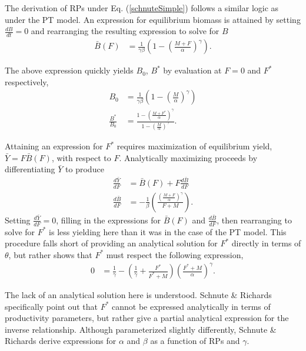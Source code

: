 %
The derivation of RPs under Eq. (\ref{schnuteSimple}) follows a similar logic
as under the PT model. An expression for equilibrium biomass is attained by
setting $\frac{dB}{dt}=0$ and rearranging the resulting expression to solve
for $B$
%
\begin{align}
\bar{B}(F) &= \frac{1}{\gamma \beta}\left(1-\left(\frac{M+F}{\alpha}\right)^\gamma\right).
\label{BsEq}
\end{align}

%
The above expression quickly yields $B_0$, $B^*$ by evaluation at $F=0$ and $F^*$ respectively,
\begin{align}
B_0 &= \frac{1}{\gamma \beta}\left(1-\left(\frac{M}{\alpha}\right)^\gamma\right) \label{B0S}\\
\frac{B^*}{B_0} &= \frac{1-\left(\frac{M+F^*}{\alpha}\right)^\gamma}{ 1-\left(\frac{M}{\alpha}\right)^\gamma }. \label{BratS}
\end{align}


%
Attaining an expression for $F^*$ requires maximization of equilibrium
yield, \mbox{$\bar{Y}=F\bar{B}(F)$}, with respect to $F$. Analytically maximizing
proceeds by differentiating $\bar{Y}$ to produce
%
\begin{align}
\frac{d \bar{Y}}{dF} &= \bar B(F) + F \frac{d \bar B}{dF} \label{FderivS}\\
\frac{d \bar B}{dF} &= -\frac{1}{\beta}  \left(\frac{\left(\frac{M+F}{\alpha}\right)^\gamma}{F+M}\right)\label{dBdFS}.
\end{align}
%
Setting $\frac{d \bar{Y}}{dF}=0$, filling in the expressions for $\bar B(F)$
and $\frac{d \bar B}{dF}$, then rearranging to solve for $F^*$ is less
yielding here than it was in the case of the PT model. This procedure falls
short of providing an analytical solution for $F^*$ directly in terms of
$\theta$, %
but rather shows that $F^*$ must respect the following expression,
%
\begin{align}\label{FmsyS}
0 &= \frac{1}{\gamma} - \left(\frac{1}{\gamma} + \frac{F^*}{F^*+M}\right)\left(\frac{F^*+M}{\alpha}\right)^\gamma.
\end{align}

The lack of an analytical solution here is understood.
Schnute \& Richards \cite[pg. 519]{schnute_analytical_1998} specifically point out that
$F^*$ cannot be expressed analytically in terms of productivity parameters,
but rather give a partial analytical expression for the inverse relationship.
Although parameterized slightly differently, Schnute \& Richards %
derive expressions for $\alpha$ and $\beta$ as a function of RPs and $\gamma$.

